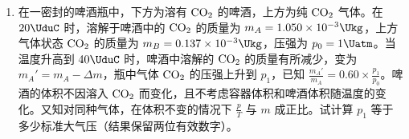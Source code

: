 \documentclass[\gkver]{gaokaozhenti}
\begin{document}
\begin{enumerate}
{$v=at$ ①

杆切割磁力线，将产生感应电动势

$\varepsilon=Blv$ ②

在杆、轨道和电阻的闭合回路中产生电流

$I=\frac{\varepsilon}{R}$ ③

杆受到的安培力为

$f=BIl$ ④

根据牛顿第二定律，有

$F-f=ma$ ⑤

联立以上各式，得

$F=\frac{B^{2}l^{2}a}{R}t+ma$ ⑥

由图线上取两点代入⑥式，可解得

$a=10\Umsq$，$m=0.1\Ukg$。
}

\item
在一密封的啤酒瓶中，下方为溶有 $\ce{CO2}$ 的啤酒，上方为纯 $\ce{CO2}$ 气体。在 $20\UduC$ 时，溶解于啤酒中的 $\ce{CO2}$ 的质量为 $m_{A} = 1.050\times10^{-3}\Ukg$，上方气体状态 $\ce{CO2}$ 的质量为 $m_{B} = 0.137\times10^{-3}\Ukg$，压强为 $p_{0} = 1\Uatm$。当温度升高到 $40\UduC$ 时，啤酒中溶解的 $\ce{CO2}$ 的质量有所减少，变为 $m_{A}' = m_{A} - \Delta m$，瓶中气体 $\ce{CO2}$ 的压强上升到 $p_{1}$，已知 $\frac{m_{A}'}{m_{A}} = 0.60\times\frac{p_{1}}{p_{0}}$。啤酒的体积不因溶入 $\ce{CO2}$ 而变化，且不考虑容器体积和啤酒体积随温度的变化。又知对同种气体，在体积不变的情况下 $\frac{p}{T}$ 与 $m$ 成正比。试计算 $p_{1}$ 等于多少标准大气压（结果保留两位有效数字）。
\end{enumerate}
\end{document}
